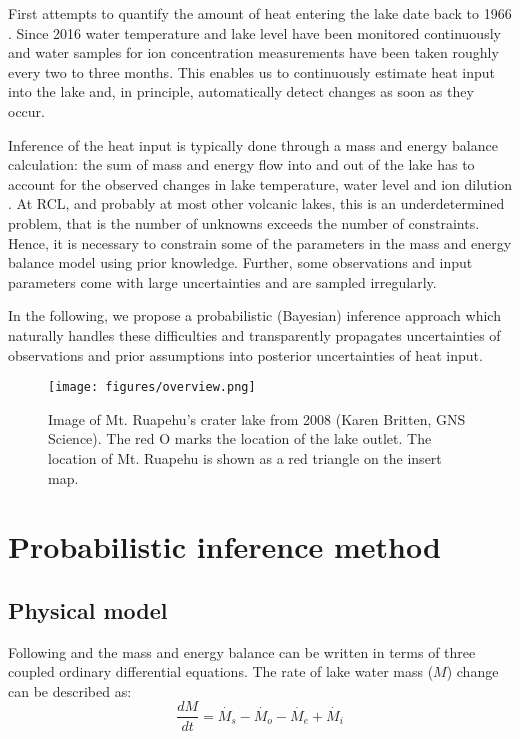 \documentclass{bmcart}
\begin{document}
First attempts to quantify the amount of heat entering the lake date back to
1966 \citep{Dibble1966}. Since 2016 water temperature and lake level have been
monitored continuously and water samples for ion concentration measurements have
been taken roughly every two to three months. This enables us to continuously
estimate heat input into the lake and, in principle, automatically detect
changes as soon as they occur.

Inference of the heat input is typically done through a mass and energy balance
calculation: the sum of mass and energy flow into and out of the lake has to
account for the observed changes in lake temperature, water level and ion
dilution \cite{Hurst1981, Hurst1991, Stevenson1992, Fournier2009, Scott1994}. At
RCL, and probably at most other volcanic lakes, this is an underdetermined
problem, that is the number of unknowns exceeds the number of constraints.
Hence, it is necessary to constrain some of the parameters in the mass and
energy balance model using prior knowledge. Further, some observations and input
parameters come with large uncertainties and are sampled irregularly.

In the following, we propose a probabilistic (Bayesian) inference approach which
naturally handles these difficulties and transparently propagates uncertainties of
observations and prior assumptions into posterior uncertainties of heat input.

\begin{figure}
\texttt{[image: figures/overview.png]}  
\caption{Image of Mt. Ruapehu's crater lake from 2008 (\textcopyright Karen
	Britten, GNS Science). The red O marks the location of the lake outlet. The
	location of Mt. Ruapehu is shown as a red triangle on the insert map.}
  \label{overview}
\end{figure}


\section{Probabilistic inference method}\label{Pim}

\subsection{Physical model}\label{phm}

Following \cite{Hurst1991} and \cite{Stevenson1992} the mass and energy balance
can be written in terms of three coupled ordinary differential equations. The
rate of lake water mass ($M$) change can be described as:
\begin{equation}\label{ode_M}
	\frac{dM}{dt} = \dot{M_s} - \dot{M_o} - \dot{M_e} + \dot{M_i}
\end{equation}
\end{document}

